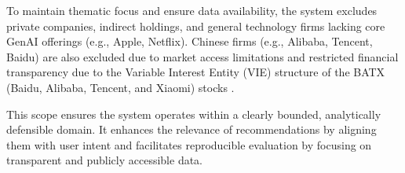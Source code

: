 To maintain thematic focus and ensure data availability, the system excludes private companies, indirect holdings, and general technology firms lacking core GenAI offerings (e.g., Apple, Netflix). Chinese firms (e.g., Alibaba, Tencent, Baidu) are also excluded due to market access limitations \cite{usdoc2022exportcontrols} and restricted financial transparency due to the Variable Interest Entity (VIE) structure of the BATX (Baidu, Alibaba, Tencent, and Xiaomi) stocks \cite{chen2021vie}.

This scope ensures the system operates within a clearly bounded, analytically defensible domain. It enhances the relevance of recommendations by aligning them with user intent and facilitates reproducible evaluation by focusing on transparent and publicly accessible data.
